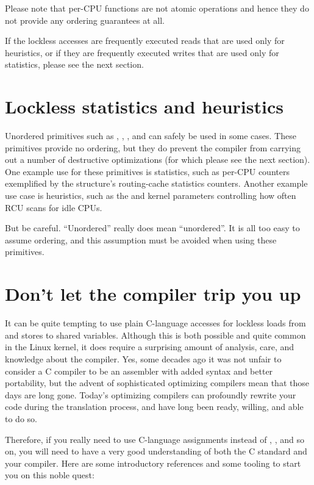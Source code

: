 Please note that per-CPU functions are not atomic operations and
hence they do not provide any ordering guarantees at all.

If the lockless accesses are frequently executed reads that are used
only for heuristics, or if they are frequently executed writes that
are used only for statistics, please see the next section.


\section{Lockless statistics and heuristics}

Unordered primitives such as , ,
, and  can safely be used in some cases.
These primitives provide no ordering, but they do prevent the compiler
from carrying out a number of destructive optimizations (for which
please see the next section).
One example use for these primitives is statistics, such as per-CPU
counters exemplified by the  structure's routing-cache
statistics counters.
Another example use case is heuristics, such as the
 and  kernel parameters
controlling how often RCU scans for idle CPUs.

But be careful.
``Unordered'' really does mean ``unordered''.
It is all too easy to assume ordering, and this assumption must be
avoided when using these primitives.


\section{Don't let the compiler trip you up}

It can be quite tempting to use plain C-language accesses for lockless
loads from and stores to shared variables.
Although this is both possible and quite common in the Linux kernel,
it does require a surprising amount of analysis, care, and knowledge
about the compiler.
Yes, some decades ago it was not unfair to consider a C compiler to be
an assembler with added syntax and better portability, but the advent of
sophisticated optimizing compilers mean that those days are long gone.
Today's optimizing compilers can profoundly rewrite your code during the
translation process, and have long been ready, willing, and able to do so.

Therefore, if you really need to use C-language assignments instead of
, , and so on, you will need to have a very good
understanding of both the C standard and your compiler.
Here are some introductory references and some tooling to start you on
this noble quest:

